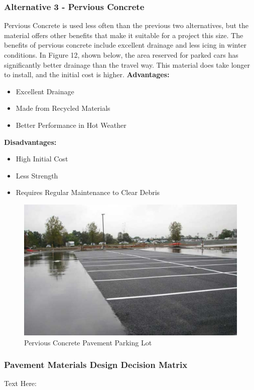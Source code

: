 \documentclass{ceri}
\begin{document}
\subsubsection{Alternative 3 - Pervious Concrete}
Pervious Concrete is used less often than the previous two alternatives, but the material offers other benefits that make it suitable for a project this size. The benefits of pervious concrete include excellent drainage and less icing in winter conditions. In Figure 12, shown below, the area reserved for parked cars has significantly better drainage than the travel way. This material does take longer to install, and the initial cost is higher. 
\textbf{Advantages:}
\begin{itemize}
    \item Excellent Drainage
    \item Made from Recycled Materials
    \item Better Performance in Hot Weather
\end{itemize}
\textbf{Disadvantages:}
\begin{itemize}
    \item High Initial Cost
    \item Less Strength
    \item Requires Regular Maintenance to Clear Debris
\end{itemize}


\begin{figure}[H]
    \centering
    \includegraphics[width=.7\textwidth]{images/Pavement3.png}
    \caption{Pervious Concrete Pavement Parking Lot}
    \label{fig:P_PCPPL}
\end{figure}

\subsubsection{Pavement Materials Design Decision Matrix}
Text Here:
\end{document}

